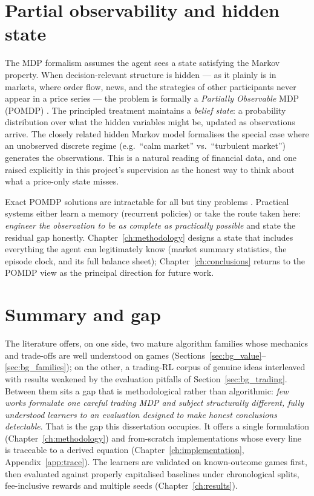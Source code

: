 \section{Partial observability and hidden state}
\label{sec:bg_pomdp}

The MDP formalism assumes the agent sees a state satisfying the Markov
property. When decision-relevant structure is hidden --- as it plainly is
in markets, where order flow, news, and the strategies of other
participants never appear in a price series --- the problem is formally a
\emph{Partially Observable} MDP (POMDP) \cite{kaelbling1998}. The
principled treatment maintains a \emph{belief state}: a probability
distribution over what the hidden variables might be, updated as
observations arrive. The closely related hidden Markov model
\cite{rabiner1989} formalises the special case where an unobserved
discrete regime (e.g.\ ``calm market'' vs.\ ``turbulent market'')
generates the observations. This is a natural reading of financial data,
and one raised explicitly in this project's supervision as the honest way
to think about what a price-only state misses.

Exact POMDP solutions are intractable for all but tiny problems
\cite{kaelbling1998}. Practical systems either learn a memory (recurrent
policies) or take the route taken here: \emph{engineer the observation
to be as complete as practically possible} and state the residual gap
honestly. Chapter~\ref{ch:methodology} designs a state that includes
everything the agent can legitimately know (market summary statistics,
the episode clock, and its full balance sheet); Chapter~\ref{ch:conclusions}
returns to the POMDP view as the principal direction for future work.

\section{Summary and gap}
\label{sec:bg_gap}

The literature offers, on one side, two mature algorithm families whose
mechanics and trade-offs are well understood on games
(Sections~\ref{sec:bg_value}--\ref{sec:bg_families}); on the other, a
trading-RL corpus of genuine ideas \cite{moody2001, deng2017, theate2021}
interleaved with results weakened by the evaluation pitfalls of
Section~\ref{sec:bg_trading}. Between them sits a gap that is
methodological rather than algorithmic: \emph{few works formulate one
careful trading MDP and subject structurally different, fully understood
learners to an evaluation designed to make honest conclusions
detectable}. That is the gap this dissertation occupies. It offers a
single formulation (Chapter~\ref{ch:methodology}) and from-scratch
implementations whose every line is traceable to a derived equation
(Chapter~\ref{ch:implementation}, Appendix~\ref{app:trace}). The learners
are validated on known-outcome games first, then evaluated against
properly capitalised baselines under chronological splits, fee-inclusive
rewards and multiple seeds (Chapter~\ref{ch:results}).

